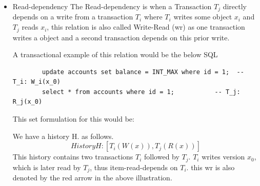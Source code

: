 \documentclass[a4paper,10pt,titlepage]{report}
\begin{document}
    \begin{itemize}
        \item Read-dependency
        The Read-dependency is when a Transaction $T_j$ directly depends on a write from a transaction $T_i$ where $T_i$ writes some object $x_i$ and $T_j$ reads $x_i$, this relation is also called Write-Read (wr) as one transaction writes a object and a second transaction depends on this prior write.
        


A transactional example of this relation would be the below SQL
        
        \begin{lstlisting}
        update accounts set balance = INT_MAX where id = 1;  -- T_i: W_i(x_0)
        select * from accounts where id = 1;           -- T_j: R_j(x_0)
        \end{lstlisting}
        
        This set formulation for this would be:
        
        We have a history H. as follows.
        \begin{equation}
            History H: [T_i(W(x)), T_j(R(x))]
        \end{equation}
        This history contains two transactions $T_i$ followed by $T_j$. $T_i$ writes version $x_0$, which is later read by $T_j$, thus item-read-depends on $T_i$. this wr is also denoted by the red arrow in the above illustration.
        

\end{itemize}
\end{document}
